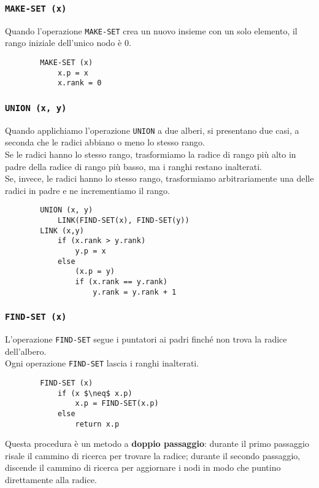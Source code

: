 \subsubsection{\texttt{MAKE-SET (x)}}
Quando l'operazione \texttt{MAKE-SET} crea un nuovo insieme con un solo elemento, il rango iniziale dell'unico nodo è 0.
    \begin{lstlisting}
        MAKE-SET (x)
            x.p = x
            x.rank = 0
    \end{lstlisting}
    
\subsubsection{\texttt{UNION (x, y)}}
Quando applichiamo l'operazione \texttt{UNION} a due alberi, si presentano due casi, a seconda che le radici abbiano o meno lo stesso rango.\\
Se le radici hanno lo stesso rango, trasformiamo la radice di rango più alto in padre della radice di rango più basso, ma i ranghi restano inalterati.\\
Se, invece, le radici hanno lo stesso rango, trasformiamo arbitrariamente una delle radici in padre e ne incrementiamo il rango.
    \begin{lstlisting}
        UNION (x, y)
            LINK(FIND-SET(x), FIND-SET(y))
        LINK (x,y)
            if (x.rank > y.rank)
                y.p = x
            else 
                (x.p = y)
                if (x.rank == y.rank)
                    y.rank = y.rank + 1
    \end{lstlisting}
    
\subsubsection{\texttt{FIND-SET (x)}}
L'operazione \texttt{FIND-SET} segue i puntatori ai padri finché non trova la radice dell'albero.\\
Ogni operazione \texttt{FIND-SET} lascia i ranghi inalterati.
    \begin{lstlisting}
        FIND-SET (x)
            if (x $\neq$ x.p)
                x.p = FIND-SET(x.p)
            else
                return x.p
    \end{lstlisting}
Questa procedura è un metodo a \textbf{doppio passaggio}: durante il primo passaggio risale il cammino di ricerca per trovare la radice; durante il secondo passaggio, discende il cammino di ricerca per aggiornare i nodi in modo che puntino direttamente alla radice.

